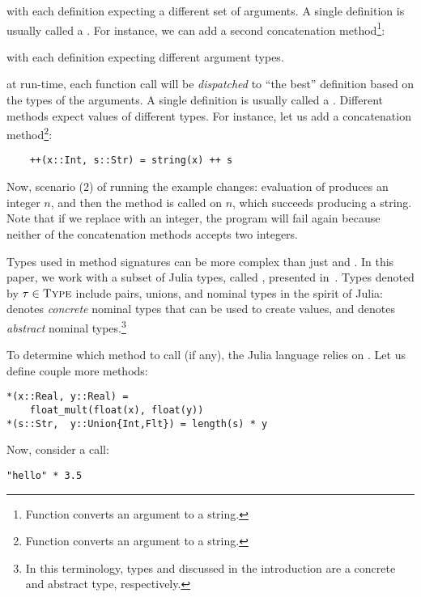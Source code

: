 with each definition expecting a different set of arguments.
A single definition is usually called a .
For instance, we can add a second concatenation method\footnote{Function 
	 converts an argument to a string.}:


with each definition expecting different argument types.


at run-time, each function call will be \emph{dispatched} 
to ``the best'' definition based on the types of the arguments.
A single definition is usually called a . 
Different methods expect values of different types. %
For instance, let us add a concatenation method\footnote{Function 
	 converts an argument to a string.}:
\begin{verbatim}
    ++(x::Int, s::Str) = string(x) ++ s
\end{verbatim}
Now, scenario (2) of running the example changes:
evaluation of  produces an integer $n$, 
and then the method  is called on 
\jlcode{(}$n$,
which succeeds producing a string.
Note that if we replace  with an integer, the program will fail
again because neither of the concatenation methods accepts two integers.

Types used in method signatures can be more complex than 
just  and . 
In this paper, we work with a subset of Julia types, called \BetaJulia,
presented in~.
Types denoted by $\tau \in \textsc{Type}$ include pairs,
unions, and nominal types in the spirit of Julia:
\cname denotes \emph{concrete} nominal types that can be used to create values,
and \aname denotes \emph{abstract} nominal types.\footnote{
In this terminology, types  and  discussed 
in the introduction are a concrete and abstract type, respectively.}

To determine which method to call (if any), the Julia language relies on
.
Let us define couple more methods:
\begin{verbatim}
*(x::Real, y::Real) = 
    float_mult(float(x), float(y))
*(s::Str,  y::Union{Int,Flt}) = length(s) * y
\end{verbatim}
Now, consider a call:
\begin{verbatim}
"hello" * 3.5
\end{verbatim}
 


